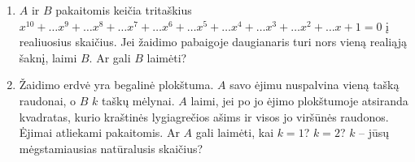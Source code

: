 \begin{enumerate}
%

\item $A$ ir $B$ pakaitomis keičia tritaškius $x^{10}+\dots x^9+\dots x^8+\dots
  x^7+\dots x^6+\dots x^5+\dots x^4+\dots x^3+\dots x^2+\dots x+1=0$ į
  realiuosius skaičius. Jei žaidimo pabaigoje daugianaris turi nors vieną
  realiąją šaknį, laimi $B$. Ar gali $B$ laimėti?


\item \text{[Kvant 1987]} Žaidimo erdvė yra begalinė plokštuma. $A$ savo
  ėjimu nuspalvina vieną tašką raudonai, o $B$ $k$ taškų mėlynai. $A$
  laimi, jei po jo ėjimo plokštumoje atsiranda kvadratas, kurio kraštinės
  lygiagrečios ašims ir visos jo viršūnės raudonos. Ėjimai atliekami
  pakaitomis. Ar $A$ gali laimėti, kai $k=1$? $k=2$? $k$ – jūsų
  mėgstamiausias natūralusis skaičius?


\end{enumerate}
